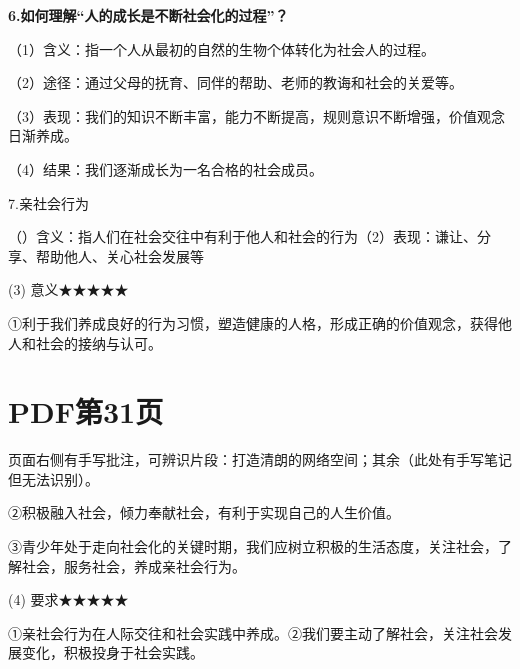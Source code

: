 \documentclass[lang=cn,11pt]{elegantbook}
\newcommand{\daofasym}[1]{{\daofasymbolfont #1}}
\newcommand{\daofasym}[1]{#1}
\begin{document}
\textbf{6.如何理解“人的成长是不断社会化的过程”？}\par

（1）含义：指一个人从最初的自然的生物个体转化为社会人的过程。\par

（2）途径：通过父母的抚育、同伴的帮助、老师的教诲和社会的关爱等。\par

（3）表现：我们的知识不断丰富，能力不断提高，规则意识不断增强，价值观念日渐养成。\par

（4）结果：我们逐渐成长为一名合格的社会成员。\par

7.亲社会行为\par

（）含义：指人们在社会交往中有利于他人和社会的行为（2）表现：谦让、分享、帮助他人、关心社会发展等\par

(3) 意义\daofasym{★}\daofasym{★}\daofasym{★}\daofasym{★}\daofasym{★}\par

\daofasym{①}利于我们养成良好的行为习惯，塑造健康的人格，形成正确的价值观念，获得他人和社会的接纳与认可。\par


\section*{PDF第31页}

\begin{note}[手写批注]
页面右侧有手写批注，可辨识片段：打造清朗的网络空间；其余（此处有手写笔记但无法识别）。\par
\end{note}

\daofasym{②}积极融入社会，倾力奉献社会，有利于实现自己的人生价值。\par

\daofasym{③}青少年处于走向社会化的关键时期，我们应树立积极的生活态度，关注社会，了解社会，服务社会，养成亲社会行为。\par

(4) 要求\daofasym{★}\daofasym{★}\daofasym{★}\daofasym{★}\daofasym{★}\par

\daofasym{①}亲社会行为在人际交往和社会实践中养成。\daofasym{②}我们要主动了解社会，关注社会发展变化，积极投身于社会实践。\par
\end{document}
